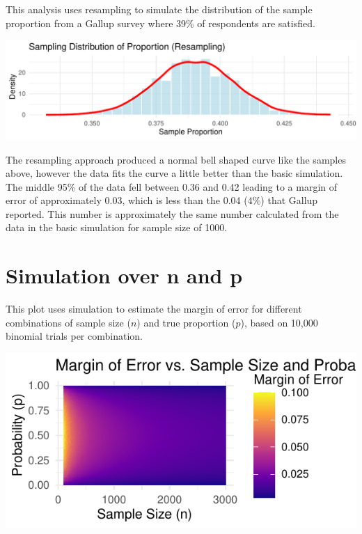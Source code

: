 \documentclass{article}\usepackage[]{graphicx}\usepackage[]{xcolor}
\makeatletter
\def\maxwidth{ %
  \ifdim\Gin@nat@width>\linewidth
    \linewidth
  \else
    \Gin@nat@width
  \fi
}
\newenvironment{knitrout}{}{} %
\makeatother
\begin{document}
\begin{multicols}{2}
This analysis uses resampling to simulate the distribution of the sample proportion from a Gallup survey where 39\% of respondents are satisfied.

\begin{knitrout}
\color{fgcolor}
\includegraphics[width=\maxwidth]{figure/unnamed-chunk-2-1} 
\end{knitrout}

The resampling approach produced a normal bell shaped curve like the samples above, however the data fits the curve a little better than the basic simulation. The middle 95\% of the data fell between 0.36 and 0.42 leading to a margin of error of approximately 0.03, which is less than the 0.04 (4\%) that Gallup reported. This number is approximately the same number calculated from the data in the basic simulation for sample size of 1000. 

\section{Simulation over n and p}

This plot uses simulation to estimate the margin of error for different combinations of sample size ($n$) and true proportion ($p$), based on 10,000 binomial trials per combination.

\begin{knitrout}
\color{fgcolor}
\includegraphics[width=\maxwidth]{figure/unnamed-chunk-3-1} 
\end{knitrout}


\end{multicols}
\end{document}
